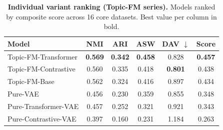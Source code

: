 \begin{table}[!htbp]
\centering
\caption{\textbf{Individual variant ranking (Topic-FM series).} Models ranked by composite score across 16 core datasets. Best value per column in bold.}
\label{tab:topic_variant_ranking}
\begin{tabular}{lccccc}
\toprule
Model & NMI & ARI & ASW & DAV $\downarrow$ & Score \\
\midrule
Topic-FM-Transformer & \textbf{0.569} & \textbf{0.342} & \textbf{0.458} & 0.828 & \textbf{0.457} \\
Topic-FM-Contrastive & 0.560 & 0.335 & 0.418 & \textbf{0.801} & 0.438 \\
Topic-FM-Base & 0.562 & 0.324 & 0.416 & 0.897 & 0.434 \\
Pure-VAE & 0.456 & 0.230 & 0.359 & 0.855 & 0.348 \\
Pure-Transformer-VAE & 0.457 & 0.252 & 0.321 & 0.921 & 0.343 \\
Pure-Contrastive-VAE & 0.397 & 0.160 & 0.231 & 1.184 & 0.263 \\
\bottomrule
\end{tabular}
\end{table}
